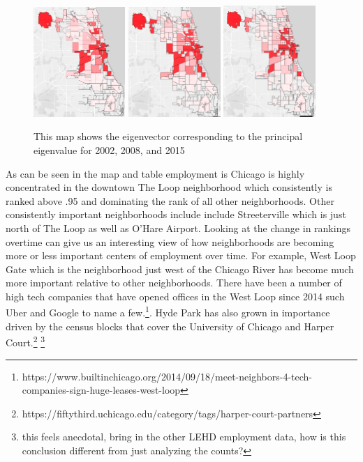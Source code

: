 \documentclass{article}
\theoremstyle{definition}
\theoremstyle{remark}
\begin{document}
\begin{figure}[H]
    \centering
    \includegraphics[width=0.31\textwidth]{Jobs-S000-2002}
    \includegraphics[width=0.31\textwidth]{Jobs-S000-2008}
    \includegraphics[width=0.31\textwidth]{Jobs-S000-2015}
    \caption{This map shows the eigenvector corresponding to the principal eigenvalue for 2002, 2008, and 2015}
    \label{fig:Jobs-S000-2008}
\end{figure}

As can be seen in the map and table employment is Chicago is highly concentrated in the downtown The Loop neighborhood which consistently is ranked above .95 and dominating the rank of all other neighborhoods.  Other consistently important neighborhoods include include Streeterville which is just north of The Loop as well as O'Hare Airport. Looking at the change in rankings overtime can give us an interesting view of how neighborhoods are becoming more or less important centers of employment over time.  For example, West Loop Gate which is the neighborhood just west of the Chicago River has become much more important relative to other neighborhoods.  There have been a number of high tech companies that have opened offices in the West Loop since 2014 such Uber and Google to name a few.\footnote{https://www.builtinchicago.org/2014/09/18/meet-neighbors-4-tech-companies-sign-huge-leases-west-loop}.  Hyde Park has also grown in importance driven by the census blocks that cover the University of Chicago and Harper Court.\footnote{https://fiftythird.uchicago.edu/category/tags/harper-court-partners} \footnote{this feels anecdotal, bring in the other LEHD employment data, how is this conclusion different from just analyzing the counts?}\\
\end{document}
